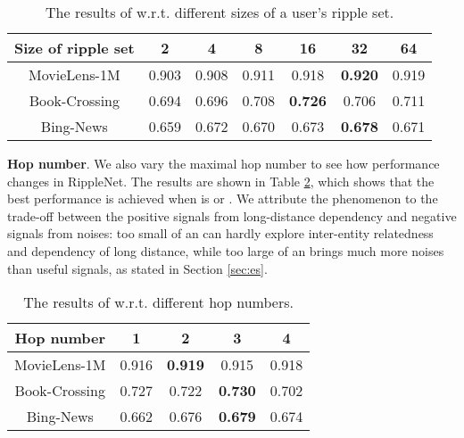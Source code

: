 \documentclass[sigconf]{acmart}
\begin{document}
        
        \begin{table}[t]
			\setlength{\abovecaptionskip}{3pt}
            \centering
            \caption{The results of  w.r.t. different sizes of a user's ripple set.}
                \begin{tabular}{c|cccccc}
                    \hline
                    Size of ripple set & 2 & 4 & 8 & 16 & 32 & 64\\
                    \hline
                    MovieLens-1M & 0.903 & 0.908 & 0.911 & 0.918 & \textbf{0.920} & 0.919 \\
                    Book-Crossing & 0.694 & 0.696 & 0.708 & \textbf{0.726} & 0.706 & 0.711 \\
                    Bing-News & 0.659 & 0.672 & 0.670 & 0.673 & \textbf{0.678} & 0.671 \\
                    \hline
				\end{tabular}
			\label{table:kg_ratio}
		\end{table}
        
        \noindent \textbf{Hop number}.
        We also vary the maximal hop number  to see how performance changes in RippleNet.
        The results are shown in Table \ref{table:hop_number}, which shows that the best performance is achieved when  is  or .
        We attribute the phenomenon to the trade-off between the positive signals from long-distance dependency and negative signals from noises: too small of an  can hardly explore inter-entity relatedness and dependency of long distance, while too large of an  brings much more noises than useful signals, as stated in Section \ref{sec:es}.
        
        	\begin{table}[t]
				\setlength{\abovecaptionskip}{3pt}
            	\centering
            	\caption{The results of  w.r.t. different hop numbers.}
                	\begin{tabular}{c|cccc}
                    	\hline
                    	Hop number  & 1 & 2 & 3 & 4 \\
                    	\hline
                    	MovieLens-1M & 0.916 & \textbf{0.919} & 0.915 & 0.918 \\
                    	Book-Crossing & 0.727 & 0.722 & \textbf{0.730} & 0.702 \\
                    	Bing-News & 0.662 & 0.676 & \textbf{0.679} & 0.674 \\
                    	\hline
					\end{tabular}
					\vspace{-0.05in}
				\label{table:hop_number}
			\end{table}
		
\end{document}
